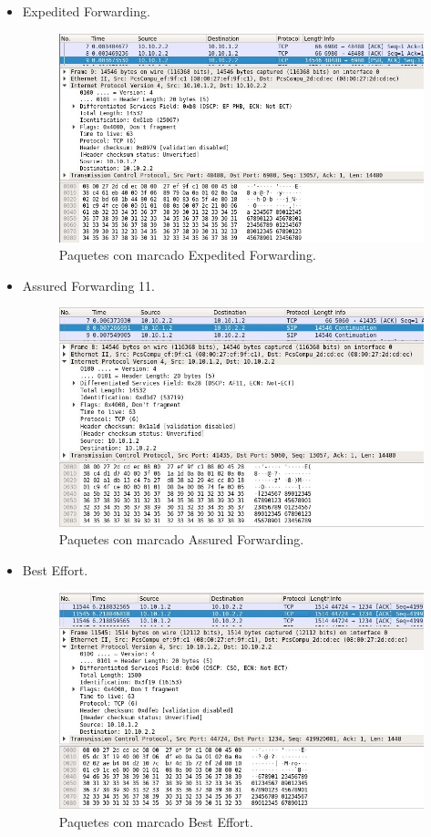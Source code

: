 \documentclass[11pt]{article}
\begin{document}
\begin{itemize}
\item Expedited Forwarding.
\begin{figure}[hbtp]
\centering
\includegraphics[scale=0.5]{EF.jpg}
\caption{Paquetes con marcado Expedited Forwarding.}
\end{figure}

\newpage
\item Assured Forwarding 11.
\begin{figure}[hbtp]
\centering
\includegraphics[scale=0.5]{AF11.jpg}
\caption{Paquetes con marcado Assured Forwarding.}
\end{figure}

\newpage
\item Best Effort.
\begin{figure}[hbtp]
\centering
\includegraphics[scale=0.5]{BestEffort.jpg}
\caption{Paquetes con marcado Best Effort.}
\end{figure}

\end{itemize}
\newpage
\end{document}
